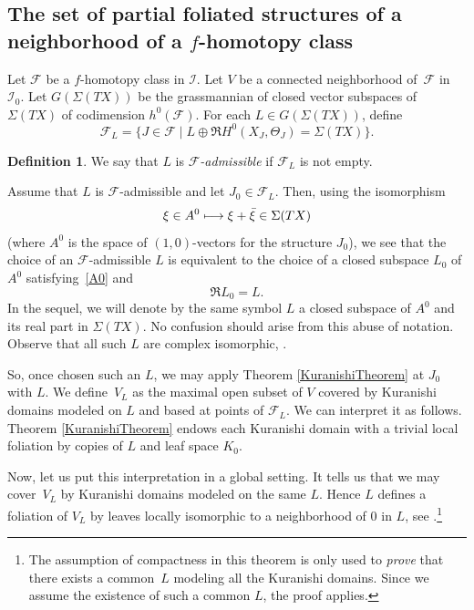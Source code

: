 \documentclass[JEP,XML,SOM,Unicode]{cedram}
\let\mathcal\mathscr
\def\mto{\mathchoice{\longmapsto}{\mapsto}{\mapsto}{\mapsto}}
\theoremstyle{plain}
\theoremstyle{definition}
\newtheorem{definition}[theorem]{Definition}
\theoremstyle{remark}
\numberwithin{equation}{section}
\newcommand{\cI}{\mathcal{I}}
\begin{document}
\subsection{The set of partial foliated structures of a neighborhood of a $f$-homotopy class}
\label{multifoliatefclass}
Let $\mathcal F$ be a $f$-homotopy class in $\cI$. Let $V$ be a connected neighborhood of~$\mathcal F$ in $\cI_0$. Let $G(\Sigma(TX))$ be the grassmannian of closed vector subspaces of $\Sigma (TX)$ of codimension $h^0(\mathcal F)$. For each $L\in G(\Sigma (TX))$,
define
\begin{equation}
\label{FL}
\mathcal F_L=\{J\in\mathcal F\mid L\oplus \Re H^0(X_J,\Theta_J)=\Sigma(TX)\}.
\end{equation}

\begin{definition}
\label{Fadmissible}
We say that $L$ is \emph{$\mathcal F$-admissible} if $\mathcal F_L$ is not empty.
\end{definition}

Assume that $L$ is $\mathcal F$-admissible and let $J_0\in\mathcal F_L$. Then, using the isomorphism
\begin{equation}
\label{real}
\xi\in A^0\mto \xi+\bar\xi\in \Sigma (TX)
\end{equation}
(where $A^0$ is the space of $(1,0)$-vectors for the structure $J_0$), we see that the choice of an $\mathcal F$-admissible $L$ is equivalent to the choice of a closed subspace $L_0$ of $A^0$ satisfying~\eqref{A0} and
\begin{equation}
\label{L0L}
\Re L_0=L.
\end{equation}
In the sequel, we will denote by the same symbol $L$ a closed subspace of $A^0$ and its real part in $\Sigma (TX)$. No confusion should arise from this abuse of notation. Observe that all such $L$ are complex isomorphic, \cf \cite[Lem.\,7.1]{circle}.

So, once chosen such an $L$, we may apply Theorem \ref{KuranishiTheorem} at $J_0$ with $L$.
We define~$V_L$ as the maximal open subset of $V$ covered by Kuranishi domains modeled on $L$ and based at points of $\mathcal F_L$. We can interpret it as follows. Theorem \ref{KuranishiTheorem} endows each Kuranishi domain with a trivial local foliation by copies of $L$ and leaf space $K_0$.

Now, let us put this interpretation in a global setting. It tells us that we may cover~$V_L$ by Kuranishi domains modeled on the same $L$.
Hence $L$ defines a foliation of $V_L$ by leaves locally isomorphic to a neighborhood of $0$ in $L$, see \cite[Th.\,7.2]{circle}.\footnote{The assumption of compactness in this theorem is only used to \emph{prove} that there exists a common~$L$ modeling all the Kuranishi domains. Since we assume the existence of such a common $L$, the proof applies.}
\end{document}
